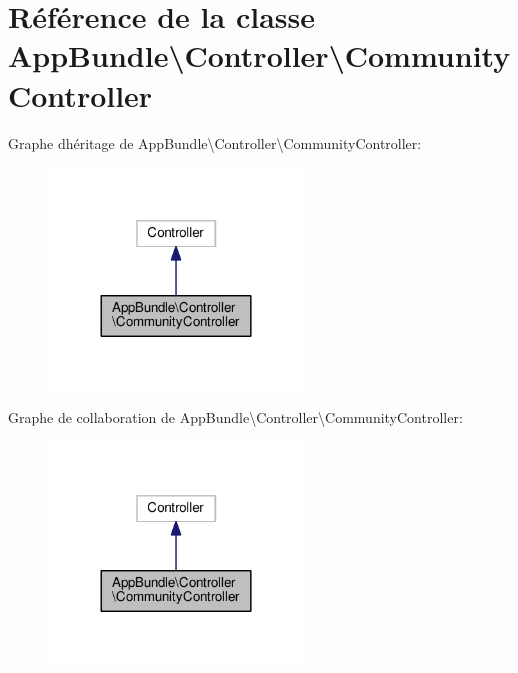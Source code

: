 \hypertarget{classAppBundle_1_1Controller_1_1CommunityController}{}\section{Référence de la classe App\+Bundle\textbackslash{}Controller\textbackslash{}Community\+Controller}
\label{classAppBundle_1_1Controller_1_1CommunityController}


Graphe d\textquotesingle{}héritage de App\+Bundle\textbackslash{}Controller\textbackslash{}Community\+Controller\+:\nopagebreak
\begin{figure}[H]
\begin{center}
\leavevmode
\includegraphics[width=192pt]{classAppBundle_1_1Controller_1_1CommunityController__inherit__graph}
\end{center}
\end{figure}


Graphe de collaboration de App\+Bundle\textbackslash{}Controller\textbackslash{}Community\+Controller\+:\nopagebreak
\begin{figure}[H]
\begin{center}
\leavevmode
\includegraphics[width=192pt]{classAppBundle_1_1Controller_1_1CommunityController__coll__graph}
\end{center}
\end{figure}
